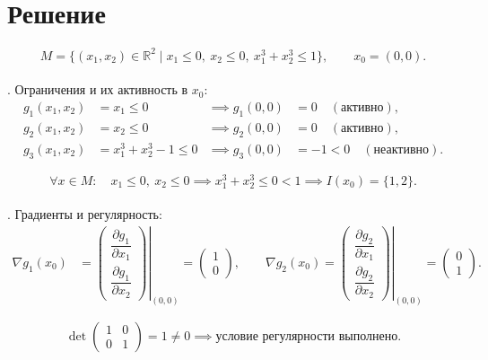 \documentclass[12pt]{article}
\begin{document}
\section*{Решение}

\[
M = \{(x_1, x_2) \in \mathbb{R}^2 \mid x_1 \le 0,\ x_2 \le 0,\ x_1^3 + x_2^3 \le 1\}, \qquad x_0 = (0, 0).
\]\\

. Ограничения и их активность в \(x_0\):
\begin{align*}
g_1(x_1, x_2) &= x_1 \le 0 &\implies g_1(0, 0) &= 0 \quad (\text{активно}), \\
g_2(x_1, x_2) &= x_2 \le 0 &\implies g_2(0, 0) &= 0 \quad (\text{активно}), \\
g_3(x_1, x_2) &= x_1^3 + x_2^3 - 1 \le 0 &\implies g_3(0, 0) &= -1 < 0 \quad (\text{неактивно}).
\end{align*}

\[
\forall x \in M: \quad x_1 \le 0,\ x_2 \le 0 \implies x_1^3 + x_2^3 \le 0 < 1 \implies I(x_0) = \{1, 2\}.
\]\\

. Градиенты и регулярность:
\begin{align*}
\nabla g_1(x_0) &= \left. \begin{pmatrix} \dfrac{\partial g_1}{\partial x_1} \\[8pt] \dfrac{\partial g_1}{\partial x_2} \end{pmatrix} \right|_{(0,0)} = \begin{pmatrix} 1 \\ 0 \end{pmatrix}, \qquad
\nabla g_2(x_0) = \left. \begin{pmatrix} \dfrac{\partial g_2}{\partial x_1} \\[8pt] \dfrac{\partial g_2}{\partial x_2} \end{pmatrix} \right|_{(0,0)} = \begin{pmatrix} 0 \\ 1 \end{pmatrix}.
\end{align*}

\[
\det \begin{pmatrix} 1 & 0 \\ 0 & 1 \end{pmatrix} = 1 \neq 0 \implies \text{условие регулярности выполнено.}
\]\\
\end{document}
